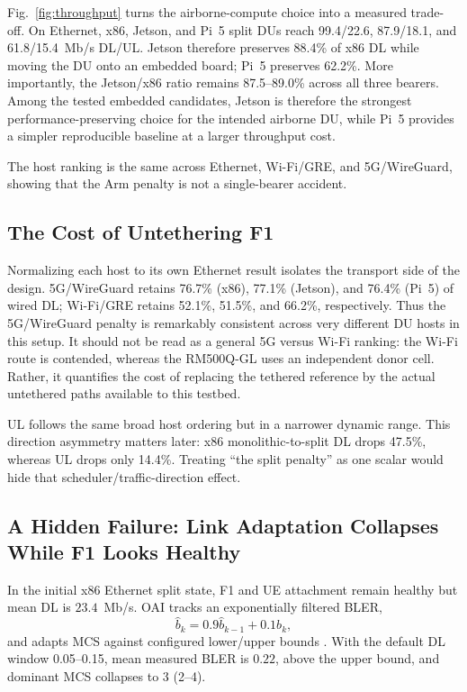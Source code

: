 \documentclass[conference]{IEEEtran}
\begin{document}
Fig.~\ref{fig:throughput} turns the airborne-compute choice into a measured
trade-off. On Ethernet, x86, Jetson, and Pi~5 split DUs reach 99.4/22.6,
87.9/18.1, and 61.8/15.4~Mb/s DL/UL. Jetson therefore preserves 88.4\% of x86
DL while moving the DU onto an embedded board; Pi~5 preserves 62.2\%. More
importantly, the Jetson/x86 ratio remains 87.5--89.0\% across all three
bearers. Among the tested embedded candidates, Jetson is therefore the
strongest performance-preserving choice for the intended airborne DU, while
Pi~5 provides a simpler reproducible baseline at a larger throughput cost.

The host ranking is the same across Ethernet, Wi-Fi/GRE, and 5G/WireGuard,
showing that the Arm penalty is not a single-bearer accident.

\subsection{The Cost of Untethering F1}
Normalizing each host to its own Ethernet result isolates the transport side
of the design. 5G/WireGuard retains 76.7\% (x86), 77.1\% (Jetson), and
76.4\% (Pi~5) of wired DL; Wi-Fi/GRE retains 52.1\%, 51.5\%, and 66.2\%,
respectively. Thus the 5G/WireGuard penalty is remarkably consistent across
very different DU hosts in this setup. It should not be read as a general 5G
versus Wi-Fi ranking: the Wi-Fi route is contended, whereas the RM500Q-GL uses
an independent donor cell. Rather, it quantifies the cost of replacing the
tethered reference by the actual untethered paths available to this testbed.

UL follows the same broad host ordering but in a narrower dynamic range. This
direction asymmetry matters later: x86 monolithic-to-split DL drops 47.5\%,
whereas UL drops only 14.4\%. Treating ``the split penalty'' as one scalar
would hide that scheduler/traffic-direction effect.

\subsection{A Hidden Failure: Link Adaptation Collapses While F1 Looks Healthy}
In the initial x86 Ethernet split state, F1 and UE attachment remain healthy
but mean DL is $23.4$~Mb/s. OAI tracks an exponentially filtered BLER,
\begin{equation}
\widehat b_k=0.9\widehat b_{k-1}+0.1b_k,
\end{equation}
and adapts MCS against configured lower/upper bounds \cite{oaimacdoc}. With the
default DL window 0.05--0.15, mean measured BLER is $0.22$, above the upper
bound, and dominant MCS collapses to 3 (2--4).
\end{document}
